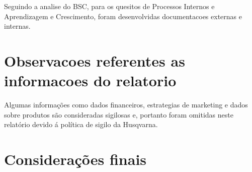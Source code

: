 \documentclass[12pt]{article}
\begin{document}
	Seguindo a analise do BSC, para os quesitos de Processos Internos e Aprendizagem e Crescimento, foram desenvolvidas documentacoes externas e internas.

\pagebreak

\section{Observacoes referentes as informacoes do relatorio}
	Algumas informações como dados financeiros, estrategias de marketing e dados sobre produtos são consideradas sigilosas e, portanto foram omitidas neste relatório devido á política de sigilo da Husqvarna.
\pagebreak

\section{Considerações finais}
\pagebreak
\end{document}
